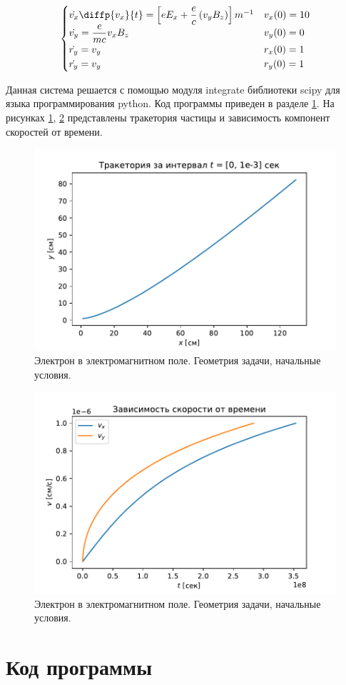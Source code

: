 \documentclass[a4paper]{article}
\begin{document}
\begin{equation}
	\begin{cases}
		\dot{v_x} \diffp{v_x}{t} = \left[eE_x + \dfrac{e}{c}\left(v_yB_z\right)\right]m^{-1}	
											& 	v_x(0) = 10 \\
		\dot{v_y} = \dfrac{e}{mc} v_x B_z	&	v_y(0) = 0 \\
		\dot{r_y} = v_y						&	r_x(0) = 1 \\
		\dot{r_y} = v_y						&	r_y(0) = 1 
	\end{cases}
\end{equation}

Данная система решается с помощью модуля integrate библиотеки scipy для языка программирования python. Код программы приведен в разделе \ref{code}. На рисунках \ref{graph_t}, \ref{graph_s} представлены тракетория частицы и зависимость компонент скоростей от времени. 

\begin{figure}

	\includegraphics[width=\textwidth]{plotTrajectory.pdf}
	\caption{Электрон в электромагнитном поле. Геометрия задачи, начальные условия.}
	\label{graph_t}
\end{figure}

\begin{figure}

	\includegraphics[width=\linewidth]{plotSpeed.pdf}
	\caption{Электрон в электромагнитном поле. Геометрия задачи, начальные условия.}
	\label{graph_s}
\end{figure}

\newpage
\section{Код программы}\label{code}

\end{document}
